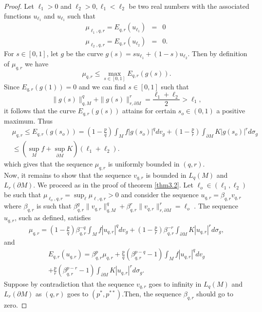 \documentclass{Tran-l}
\theoremstyle{definition}
\theoremstyle{remark}
\numberwithin{equation}{section}
\begin{document}
\begin{proof}
Let $\ell_1>0$ and $\ell_2>0,\ell_1<\ell_2$ be two real numbers with
the associated functions $u_{\ell_1}$ and $u_{\ell_1}$ such that
\begin{eqnarray*}
\mu_{\ell_1,q,r}=E_{q,r}(u_{\ell_1 })&=&0\\
\mu_{\ell_2,q,r}=E_{q,r}(u_{\ell_2} )&=&0.
\end{eqnarray*}
For $s\in[0,1]$, let $g$ be the curve $g(s)=su_{\ell_1
}+(1-s)u_{\ell_2}$. Then by definition of $\mu_{q,r}$ we have
\begin{equation*}
    \mu_{q,r}\le\max_{s\in[0,1]}E_{q,r}(g(s)).
\end{equation*}
Since $E_{q,r}(g(1))=0$ and we can find $s\in[0,1]$ such that
$$\|g(s)\|_{q,M}^q+\|g(s)\|_{r,\partial
M}^r=\frac{\ell_1+\ell_2}{2}>\ell_1,$$  it follows that the curve
$E_{q,r}(g(s))$ attains for certain $s_o\in(0,1)$ a positive
maximum. Thus
\begin{eqnarray*}
&\mu_{q,r}\le
E_{q,r}(g(s_o))=(1-\frac{p}{q})\int_Mf|g(s_o)|^qdv_g+(1-\frac{p}{r})\int_{\partial
M}K|g(s_o)|^rd\sigma_g&\\&\le(\sup_Mf+\sup_{\partial
M}K)(\ell_1+\ell_2).
\end{eqnarray*}
which gives that the sequence $\mu_{q,r}$ is uniformly bounded in
$(q,r)$.\\
Now, it remains to show that the sequence $v_{q,r}$ is bounded in
$L_q(M)$ and $L_r(\partial M)$. We proceed as in the proof of
theorem \ref{thm3.2}. Let $\ell_o\in (\ell_1,\ell_2)$ be such that
$\mu_{\ell_o,q,r}=\sup_\ell\mu_{\ell,q,r}>0$ and consider the
sequence $u_{q,r}=\beta_{q,r}v_{q,r}$ where $\beta_{q,r}$ is such
that
$\beta_{q,r}^q\|v_{q,r}\|_{q,M}^q+\beta_{q,r}^r\|v_{q,r}\|_{r,\partial
M}^r=\ell_o$ . The sequence $u_{q,r}$, such as defined, satisfies
\begin{eqnarray}\label{eq7.2}
\mu_{q,r}=(1-\frac{p}{q})\beta_{q,r}^{-q}\int_Mf|u_{q,r}|^qdv_g+
(1-\frac{p}{r})\beta_{q,r}^{-r}\int_{\partial
M}K|u_{q,r}|^rd\sigma_g,
\end{eqnarray}
and
\begin{eqnarray}\label{eq7.3}
E_{q,r}(u_{q,r})= \beta_{q,r}^{p}\mu_{q,r}+\frac{p}{q}
(\beta_{q,r}^{p-q}-1)\int_Mf|u_{q,r}|^qdv_g\\
\nonumber+\frac{p}{r}(\beta_{q,r}^{p-r}-1)\int_{\partial
M}K|u_{q,r}|^rd\sigma_g.
\end{eqnarray}
Suppose by contradiction that the sequence $v_{q,r}$ goes to
infinity in $L_q(M)$ and $L_r(\partial M)$ as $(q,r)$ goes to
$(p^*,p^{**})$.Then, the sequence $\beta_{q,r}$ should go to zero.

\end{proof}
\end{document}
